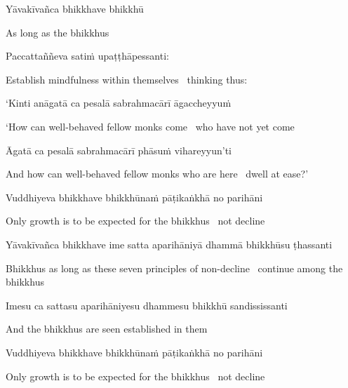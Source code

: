 Yāvakīvañca bhikkhave bhikkhū

\begin{english}
  As long as the bhikkhus
\end{english}

Paccattaññeva satiṁ upaṭṭhāpessanti:

\begin{english}
  Establish mindfulness within themselves \breathmark\ thinking thus:
\end{english}

`Kinti anāgatā ca pesalā sabrahmacārī āgaccheyyuṁ

\begin{english}
  `How can well-behaved fellow monks come \breathmark\ who have not yet come
\end{english}

Āgatā ca pesalā sabrahmacārī phāsuṁ vihareyyun'ti

\begin{english-hang}
  And how can well-behaved fellow monks who are here \breathmark\ dwell at ease?'
\end{english-hang}

Vuddhiyeva bhikkhave bhikkhūnaṁ pāṭikaṅkhā no parihāni

\begin{english}
  Only growth is to be expected for the bhikkhus \breathmark\ not decline
\end{english}

\begin{pali-hang}
  Yāvakīvañca bhikkhave ime satta aparihāniyā dhammā bhikkhūsu ṭhassanti
\end{pali-hang}

\begin{english-hang}
  Bhikkhus as long as these seven principles of non-decline \breathmark\ continue among the bhikkhus
\end{english-hang}

Imesu ca sattasu aparihāniyesu dhammesu bhikkhū sandississanti

\begin{english}
  And the bhikkhus are seen established in them
\end{english}

Vuddhiyeva bhikkhave bhikkhūnaṁ pāṭikaṅkhā no parihāni

\begin{english}
  Only growth is to be expected for the bhikkhus \breathmark\ not decline
\end{english}

